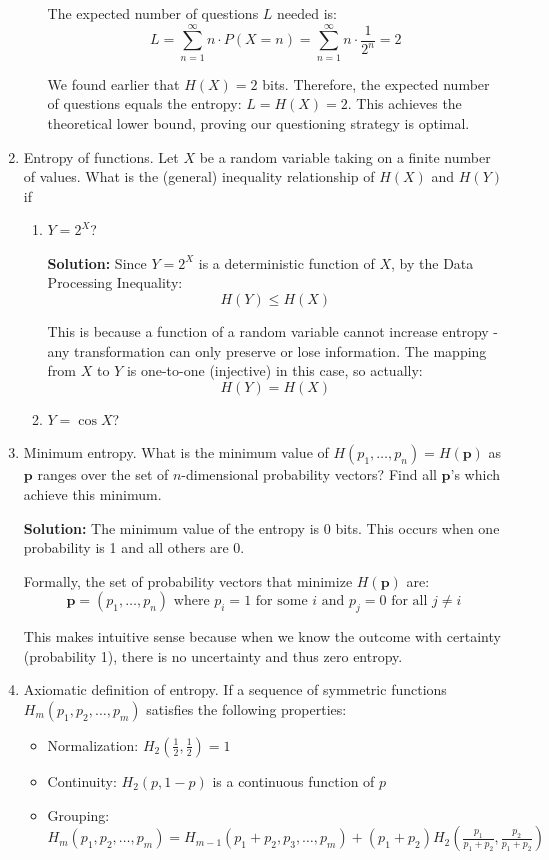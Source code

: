 \documentclass{article}
\begin{document}
\begin{enumerate}
\begin{enumerate}
        The expected number of questions $L$ needed is:
        \[
            L = \sum_{n=1}^{\infty} n \cdot P(X=n) = \sum_{n=1}^{\infty} n \cdot \frac{1}{2^n} = 2
        \]
        
        We found earlier that $H(X) = 2$ bits. Therefore, the expected number of questions equals the entropy: $L = H(X) = 2$. This achieves the theoretical lower bound, proving our questioning strategy is optimal.
    \end{enumerate}

    \item Entropy of functions. Let $X$ be a random variable taking on a finite number of values. What is the (general) inequality relationship of $H(X)$ and $H(Y)$ if
    \begin{enumerate}
        \item $Y = 2^X$?
        
        \textbf{Solution:}
        Since $Y = 2^X$ is a deterministic function of $X$, by the Data Processing Inequality:
        \[
            H(Y) \leq H(X)
        \]
        
        This is because a function of a random variable cannot increase entropy - any transformation can only preserve or lose information. The mapping from $X$ to $Y$ is one-to-one (injective) in this case, so actually:
        \[
            H(Y) = H(X)
        \]

        \item $Y = \cos X$?
    \end{enumerate}

    \item Minimum entropy. What is the minimum value of $H(p_1,\ldots,p_n) = H(\mathbf{p})$ as $\mathbf{p}$ ranges over the set of $n$-dimensional probability vectors? Find all $\mathbf{p}$'s which achieve this minimum.
    
    \textbf{Solution:} The minimum value of the entropy is 0 bits. This occurs when one probability is 1 and all others are 0.
    
    Formally, the set of probability vectors that minimize $H(\mathbf{p})$ are:
    \[
        \mathbf{p} = (p_1,\ldots,p_n) \text{ where } p_i = 1 \text{ for some } i \text{ and } p_j = 0 \text{ for all } j \neq i
    \]
    
    This makes intuitive sense because when we know the outcome with certainty (probability 1), there is no uncertainty and thus zero entropy.

    \item Axiomatic definition of entropy. If a sequence of symmetric functions $H_m(p_1, p_2, \ldots, p_m)$ satisfies the following properties:
    \begin{itemize}
        \item Normalization: $H_2(\frac{1}{2}, \frac{1}{2}) = 1$
        \item Continuity: $H_2(p, 1-p)$ is a continuous function of $p$
        \item Grouping: $H_m(p_1, p_2, \ldots, p_m) = H_{m-1}(p_1 + p_2, p_3, \ldots, p_m) + (p_1 + p_2)H_2(\frac{p_1}{p_1+p_2}, \frac{p_2}{p_1+p_2})$
    \end{itemize}


\end{enumerate}
\end{document}
